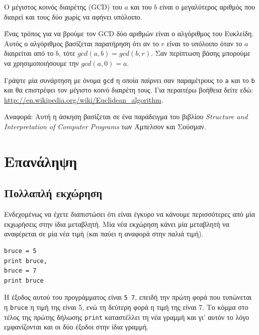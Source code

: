 \documentclass[10pt]{book}
\begin{document}
\begin{exercise}

Ο μέγιστος κοινός διαιρέτης (GCD) του $a$ και του $b$ 
είναι ο μεγαλύτερος αριθμός που διαιρεί και τους δύο χωρίς να αφήνει υπόλοιπο.

Ένας τρόπος για να βρούμε τον GCD δύο αριθμών είναι ο
αλγόριθμος του Ευκλείδη. Αυτός ο αλγόριθμος βασίζεται παρατήρηση ότι αν
το $r$ είναι το υπόλοιπο όταν το $a$ διαιρείται από
το $b$, τότε $gcd(a, b) = gcd(b, r)$.
Σαν περίπτωση βάσης μπορούμε να χρησιμοποιήσουμε την
$gcd(a, 0) = a$.

Γράψτε μία συνάρτηση με όνομα \verb"gcd" η οποία παίρνει
σαν παραμέτρους το {\tt a} και το {\tt b} και θα
επιστρέφει τον μέγιστο κοινό διαιρέτη τους. Για περαιτέρω βοήθεια
δείτε εδώ: \url{http://en.wikipedia.org/wiki/Euclidean_algorithm}.


Αναφορά: Αυτή η άσκηση βασίζεται σε ένα παράδειγμα του
βιβλίου {\em Structure and Interpretation of Computer Programs}
των Άμπελσον και Σούσμαν.

\end{exercise}


\chapter{Επανάληψη}

\section{Πολλαπλή εκχώρηση}

Ενδεχομένως να έχετε διαπιστώσει ότι είναι έγκυρο να κάνουμε περισσότερες
από μία εκχωρήσεις στην ίδια μεταβλητή. Μία νέα εκχώρηση κάνει μία μεταβλητή
να αναφέρεται σε μία νέα τιμή (και παύει η αναφορά στην παλιά τιμή). 

\begin{verbatim}
bruce = 5
print bruce,
bruce = 7
print bruce
\end{verbatim}
%

Η έξοδος αυτού του προγράμματος είναι {\tt 5 7}, επειδή την
πρώτη φορά που τυπώνεται η {\tt bruce} η τιμή της είναι 5,
ενώ τη δεύτερη φορά η τιμή της είναι 7. Το κόμμα στο τέλος της πρώτης
δήλωσης {\tt print} καταστέλλει τη νέα γραμμή και γι' αυτόν το λόγο
εμφανίζονται και οι δύο έξοδοι στην ίδια γραμμή.
\end{document}
